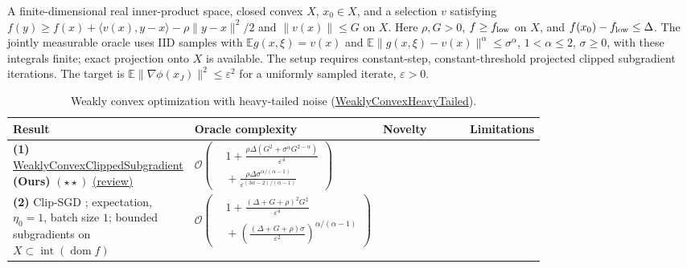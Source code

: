 \begin{table}[tp]
\centering
\caption{Weakly convex optimization with heavy-tailed noise (\href{https://github.com/k3nfalt/longtails/blob/main/LongTails/Setups/WeaklyConvexHeavyTailed.lean}{WeaklyConvexHeavyTailed}).}\label{tab:WeaklyConvexHeavyTailed}
\parbox{\linewidth}{\footnotesize A finite-dimensional real inner-product space, closed convex $X$, $x_0\in X$, and a selection $v$ satisfying $f(y)\ge f(x)+\langle v(x),y-x\rangle-\rho\|y-x\|^2/2$ and $\|v(x)\|\le G$ on $X$. Here $\rho,G>0$, $f\ge f_{\rm low}$ on $X$, and $f(x_0)-f_{\rm low}\le\Delta$. The jointly measurable oracle uses IID samples with $\mathbb E g(x,\xi)=v(x)$ and $\mathbb E\|g(x,\xi)-v(x)\|^\alpha\le\sigma^\alpha$, $1<\alpha\le2$, $\sigma\ge0$, with these integrals finite; exact projection onto $X$ is available. The setup requires constant-step, constant-threshold projected clipped subgradient iterations. The target is $\mathbb E\|\nabla\phi(x_J)\|^2\le\varepsilon^2$ for a uniformly sampled iterate, $\varepsilon>0$.}\par\smallskip
\begin{threeparttable}
\footnotesize
\setlength{\tabcolsep}{4pt}\renewcommand{\arraystretch}{1.25}
\begin{tabularx}{\linewidth}{@{}>{\raggedright\arraybackslash}p{0.20\linewidth}>{\raggedright\arraybackslash}p{0.32\linewidth}>{\raggedright\arraybackslash}p{0.25\linewidth}>{\raggedright\arraybackslash}X@{}}
\toprule
\textbf{Result} & \textbf{Oracle complexity} & \textbf{Novelty} & \textbf{Limitations} \\
\midrule
\textbf{(1)} \href{https://github.com/k3nfalt/longtails/blob/main/LongTails/Theorems/WeaklyConvexClippedSubgradient.lean}{Weakly\allowbreak Convex\allowbreak Clipped\allowbreak Subgradient} \textbf{(Ours)} $(\star\star)$ \href{https://github.com/k3nfalt/longtails/blob/main/scripts/reviews/WeaklyConvexClippedSubgradient.md}{(review)} &
$\mathcal{O}\!\left(\begin{aligned}&1+\frac{\rho\Delta(G^2+\sigma^\alpha G^{2-\alpha})}{\varepsilon^4}\\&{}+\frac{\rho\Delta\sigma^{\alpha/(\alpha-1)}}{\varepsilon^{(3\alpha-2)/(\alpha-1)}}\end{aligned}\right)$ & & \\
\midrule[1.2pt]
\textbf{(2)} Clip-SGD \citep[Thm.~5, Eq.~(27)]{wchZhu2025v1}; expectation, $\eta_0=1$, batch size $1$; bounded subgradients on $X\subset\operatorname{int}(\operatorname{dom}f)$ &
$\mathcal{O}\!\left(\begin{aligned}&1+\frac{(\Delta+G+\rho)^2G^2}{\varepsilon^4}\\&{}+\left(\frac{(\Delta+G+\rho)\sigma}{\varepsilon^2}\right)^{\!\alpha/(\alpha-1)}\end{aligned}\right)$ &

\end{tabularx}
\end{threeparttable}
\end{table}
